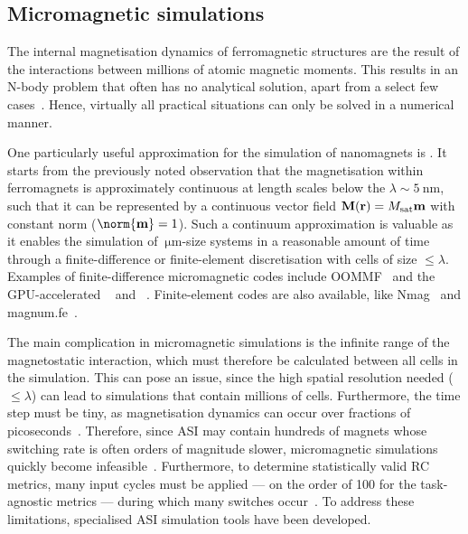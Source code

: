 \subsection{Micromagnetic simulations}
The internal magnetisation dynamics of ferromagnetic structures are the result of the interactions between millions of atomic magnetic moments.
This results in an N-body problem that often has no analytical solution, apart from a select few cases~\cite{PhD_Abert}.
Hence, virtually all practical situations can only be solved in a numerical manner. \par
One particularly useful approximation for the simulation of nanomagnets is .
It starts from the previously noted observation that the magnetisation within ferromagnets is approximately continuous at length scales below the  $\lambda \sim \SI{5}{\nano\metre}$, such that it can be represented by a continuous vector field $\boldsymbol{\mathbf{M}}(\boldsymbol{\mathbf{r}}) = M_\mathrm{sat} \boldsymbol{\mathbf{m}}$ with constant norm ($\norm{\vc{m}} = 1$).
Such a continuum approximation is valuable as it enables the simulation of $\SI{}{\micro\metre}$-size systems in a reasonable amount of time through a finite-difference or finite-element discretisation with cells of size $\leq \lambda$.
Examples of finite-difference micromagnetic codes include OOMMF~\cite{OOMMF} and the GPU-accelerated \mumax~\cite{mumax3} and \mumaxplus~\cite{MOR-24}.
Finite-element codes are also available, like Nmag~\cite{Nmag} and magnum.fe~\cite{magnumFE}. \par %
The main complication in micromagnetic simulations is the infinite range of the magnetostatic interaction, which must therefore be calculated between all cells in the simulation.
This can pose an issue, since the high spatial resolution needed ($\leq \lambda$) can lead to simulations that contain millions of cells.
Furthermore, the time step must be tiny, as magnetisation dynamics can occur over fractions of picoseconds~\cite{PhD_Leliaert}.
Therefore, since ASI may contain hundreds of magnets whose switching rate is often orders of magnitude slower, micromagnetic simulations quickly become infeasible~\cite{leo2021chiral}.
Furthermore, to determine statistically valid RC metrics, many input cycles must be applied --- on the order of 100 for the task-agnostic metrics --- during which many switches occur~\cite{RC_TaskAgnosticMetrics_v2}.
To address these limitations, specialised ASI simulation tools have been developed.


